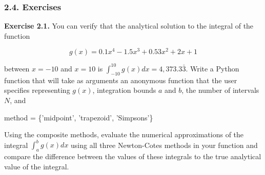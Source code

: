 \documentclass[11pt]{article}
\newenvironment{Shaded}{}{}
\newcommand{\StringTok}[1]{\textcolor[rgb]{0.25,0.44,0.63}{{#1}}}
\newcommand{\NormalTok}[1]{{#1}}
\newcommand{\OperatorTok}[1]{\textcolor[rgb]{0.40,0.40,0.40}{{#1}}}
\begin{document}
    \subsubsection{2.4. Exercises}\label{exercises}

    \textbf{Exercise 2.1.} You can verify that the analytical solution to
the integral of the function

\begin{equation*}
  g(x)=0.1x^4 -1.5x^3 + 0.53x^2 + 2x + 1
\end{equation*}

between \(x=-10\) and \(x=10\) is
\(\int_{-10}^{10} g(x)dx = 4,373.3\bar{3}\). Write a Python function
that will take as arguments an anonymous function that the user
specifies representing \(g(x)\), integration bounds \(a\) and \(b\), the
number of intervals \(N\), and

\begin{Shaded}
\begin{Highlighting}[]
\NormalTok{method }\OperatorTok{=}\NormalTok{ \{}\StringTok{'midpoint'}\NormalTok{, }\StringTok{'trapezoid'}\NormalTok{, }\StringTok{'Simpsons'}\NormalTok{\}}
\end{Highlighting}
\end{Shaded}

Using the composite methods, evaluate the numerical approximations of
the integral \(\int_a^b g(x)dx\) using all three Newton-Cotes methods in
your function and compare the difference between the values of these
integrals to the true analytical value of the integral.
\end{document}
